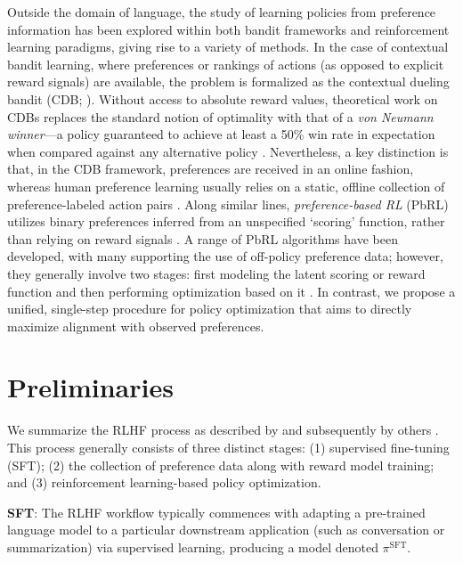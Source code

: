 Outside the domain of language, the study of learning policies from preference information has been explored within both bandit frameworks and reinforcement learning paradigms, giving rise to a variety of methods. In the case of contextual bandit learning, where preferences or rankings of actions (as opposed to explicit reward signals) are available, the problem is formalized as the contextual dueling bandit (CDB; \cite{yue2012karmed,dudik2015contextual}). Without access to absolute reward values, theoretical work on CDBs replaces the standard notion of optimality with that of a \textit{von Neumann winner}—a policy guaranteed to achieve at least a 50\% win rate in expectation when compared against any alternative policy \citep{dudik2015contextual}. Nevertheless, a key distinction is that, in the CDB framework, preferences are received in an online fashion, whereas human preference learning usually relies on a static, offline collection of preference-labeled action pairs \citep{yan2022human}. Along similar lines, \textit{preference-based RL} (PbRL) utilizes binary preferences inferred from an unspecified ‘scoring’ function, rather than relying on reward signals \citep{BusaFekete2014,ruiz2023dueling}. A range of PbRL algorithms have been developed, with many supporting the use of off-policy preference data; however, they generally involve two stages: first modeling the latent scoring or reward function and then performing optimization based on it \citep{jain2013learning,BusaFekete2014,christiano2017deep,sadigh2017active,kupcsik2018learning}. In contrast, we propose a unified, single-step procedure for policy optimization that aims to directly maximize alignment with observed preferences.

\section{Preliminaries}\label{section:prelims}

We summarize the RLHF process as described by \citeauthor{ziegler2020finetuning} and subsequently by others \citep{stiennon2022learning, bai2022training, ouyang2022training}. This process generally consists of three distinct stages: (1) supervised fine-tuning (SFT); (2) the collection of preference data along with reward model training; and (3) reinforcement learning-based policy optimization.

\textbf{SFT}: The RLHF workflow typically commences with adapting a pre-trained language model to a particular downstream application (such as conversation or summarization) via supervised learning, producing a model denoted $\pi^\text{SFT}$.

